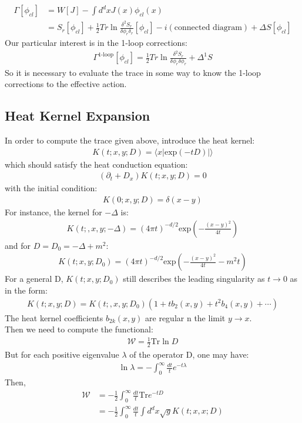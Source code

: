 \documentclass[fleqn]{article}
\begin{document}
\begin{align}
\Gamma [\phi_{cl}] &= W[J] - \int d^{d}x J(x)\phi_{cl} (x) \\
&= S_{r}[\phi _{cl}] +\frac{1}{2} Tr \ln \frac{\delta ^{2} S_{r}}{\delta \phi _{r} \delta _{r}}[\phi _{cl}] - i(\text{connected diagram}) + \Delta S[\phi_{cl}]
\end{align}
Our particular interest is in the 1-loop corrections:
\begin{align}
\Gamma^{\text{1-loop}} [\phi_{cl}]  = \frac{1}{2}Tr \ln \frac{\delta ^{2} S_{r}} {\delta \phi_{r} \delta \phi_{r}} + \Delta ^{1} S
\end{align}
So it is necessary to evaluate the trace in some way to know the 1-loop corrections to the effective action.

\subsection{Heat Kernel Expansion}
In order to compute the trace given above, introduce the heat kernel:
\begin{align}
K(t;x,y;D) = \langle x | \text{exp}(-tD) | \rangle
\end{align}
which should satisfy the heat conduction equation:
\begin{align}
(\partial _{t} + D_{x})K(t;x,y;D) = 0
\end{align}
with the initial condition:
\begin{align}
K(0;x,y;D) = \delta (x-y)
\end{align}
For instance, the kernel for $-\Delta$ is:
\begin{align}
K(t;,x,y;-\Delta) = (4\pi t)^{-d/2} \text{exp}(-\frac{(x-y)^{2}}{4t})
\end{align}
and for $D= D_{0} = -\Delta + m^{2}$:
\begin{align}
K(t;x,y;D_{0}) = (4\pi t)^{-d/2} \text{exp}(-\frac{(x-y)^{2}}{4t} - m^{2} t)
\end{align}
For a general D, $K(t;x,y;D_{0})$ still describes the leading singularity as $t \rightarrow 0$ as in the form:
\begin{align}
K(t;x,y;D) = K(t;,x,y;D_{0}) (1 + tb_{2}(x,y) + t^{2} b_{4}(x,y) + \cdots)
\end{align}
The heat kernel coefficients $b_{2k}(x,y)$ are regular n the limit $y \rightarrow x$.\\
Then we need to compute the functional:
\begin{align}
\mathcal{W} = \frac{1}{2} \text{Tr} \ln D
\end{align}
But for each positive eigenvalue $\lambda$  of the operator D, one may have:
\begin{align}
\ln \lambda = - \int_{0}^{\infty} \frac{dt}{t} e^{-t\lambda} 
\end{align}
Then,
\begin{align}
\mathcal{W} &=  -\frac{1}{2} \int_{0}^{\infty} \frac{dt}{t} \text{Tr} e^{-tD} \nonumber \\
&= -\frac{1}{2} \int_{0}^{\infty} \frac{dt}{t} \int d^{d}x \sqrt{g} K(t;x,x;D)
\end{align}
\end{document}
